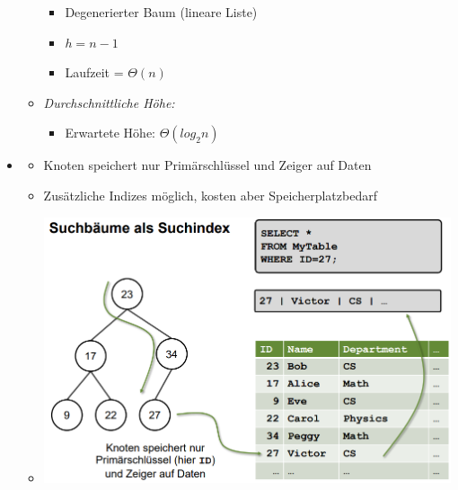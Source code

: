 \documentclass[
    12pt,
    a4paper,
    ngerman,
    color=3b,%
    marginpar=false,
    colorback=false,
    leqno,
]{tudaexercise}
\begin{document}
\begin{itemize}
\begin{itemize}
\begin{itemize}
                        \item Degenerierter Baum (lineare Liste)
                        \item $h = n - 1$
                        \item Laufzeit = $\Theta(n)$
                    \end{itemize}
              \item \textit{Durchschnittliche Höhe:}
                    \begin{itemize}
                        \item Erwartete Höhe: $\Theta(log_2 n)$
                    \end{itemize}
          \end{itemize}
    \item {}
          \begin{itemize}
              \item Knoten speichert nur Primärschlüssel und Zeiger auf Daten
              \item Zusätzliche Indizes möglich, kosten aber Speicherplatzbedarf
              \item[] \includegraphics[width=12cm]{pictures/suchbaumSuchindex.PNG}
          \end{itemize}
\end{itemize}
\pagebreak
\end{document}
